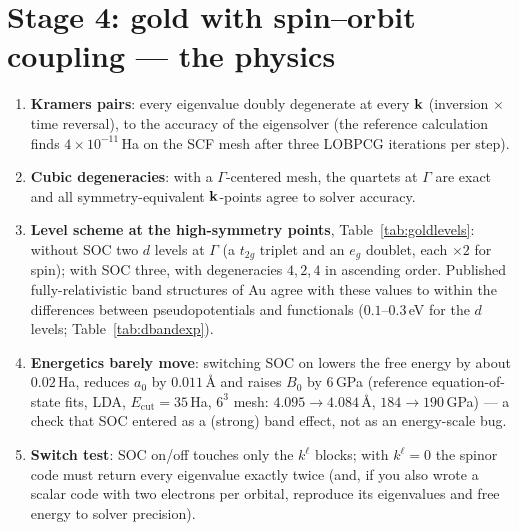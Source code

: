 \section{Stage 4: gold with spin--orbit coupling --- the physics}
\begin{enumerate}[leftmargin=2em]
\item \textbf{Kramers pairs}: every eigenvalue doubly degenerate at
every $\mathbf{k}$ (inversion $\times$ time reversal), to the accuracy of the
eigensolver (the reference calculation finds $4\times10^{-11}$\,Ha on the
SCF mesh after three LOBPCG iterations per step).
\item \textbf{Cubic degeneracies}: with a $\Gamma$-centered mesh, the
quartets at $\Gamma$ are exact and all symmetry-equivalent $\mathbf{k}$-points
agree to solver accuracy.
\item \textbf{Level scheme at the high-symmetry points},
Table~\ref{tab:goldlevels}: without SOC two $d$ levels at $\Gamma$ (a
$t_{2g}$ triplet and an $e_g$ doublet, each $\times2$ for spin); with SOC
three, with degeneracies $4, 2, 4$ in ascending order. Published
fully-relativistic band structures of Au agree with these values to
within the differences between pseudopotentials and functionals
($0.1$--$0.3$\,eV for the $d$ levels; Table~\ref{tab:dbandexp}).
\item \textbf{Energetics barely move}: switching SOC on lowers the
free energy by about $0.02$\,Ha, reduces $a_0$ by $0.011$\,\AA{} and
raises $B_0$ by $6$\,GPa (reference equation-of-state fits, LDA,
$E_{\mathrm{cut}} = 35$\,Ha, $6^3$ mesh: $4.095\to4.084$\,\AA,
$184\to190$\,GPa) --- a check that SOC entered as a (strong) band
effect, not as an energy-scale bug.
\item \textbf{Switch test}: SOC on/off touches only the $k^{\ell}$ blocks;
with $k^{\ell} = 0$ the spinor code must return every eigenvalue exactly
twice (and, if you also wrote a scalar code with two electrons per
orbital, reproduce its eigenvalues and free energy to solver precision).
\end{enumerate}

